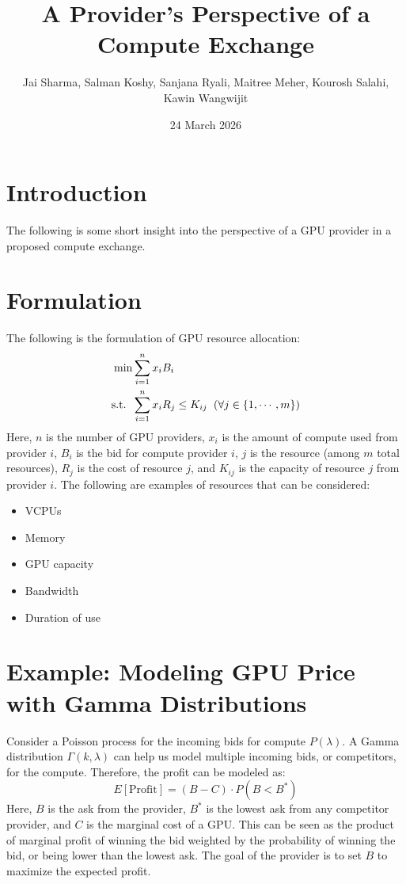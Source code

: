 \documentclass{article}
\title{A Provider's Perspective of a Compute Exchange}
\author{Jai Sharma, Salman Koshy, Sanjana Ryali, Maitree Meher, Kourosh Salahi, Kawin Wangwijit}
\date{24 March 2026}
\begin{document}
\maketitle
\tableofcontents
\newpage

\section{Introduction}
The following is some short insight into the perspective of a GPU provider in a proposed compute exchange. 

\section{Formulation}
The following is the formulation of GPU resource allocation:
\begin{align*}
    \min &\sum_{i = 1} ^n x_iB_i\\
    \text{s.t.}\hspace{2mm}&\sum_{i=1}^n x_iR_j \leq K_{ij} \hspace{2mm} (\forall j\in \{1,\cdots,m\})
\end{align*}
Here, $n$ is the number of GPU providers, $x_i$ is the amount of compute used from provider $i$, $B_i$ is the bid for compute provider $i$, $j$ is the resource (among $m$ total resources), $R_j$ is the cost of resource $j$, and $K_{ij}$ is the capacity of resource $j$ from provider $i$. The following are examples of resources that can be considered:
\begin{itemize}
    \item VCPUs
    \item Memory
    \item GPU capacity
    \item Bandwidth
    \item Duration of use
\end{itemize}

\section{Example: Modeling GPU Price with Gamma Distributions}
Consider a Poisson process for the incoming bids for compute $P(\lambda)$. A Gamma distribution $\Gamma (k, \lambda)$ can help us model multiple incoming bids, or competitors, for the compute. Therefore, the profit can be modeled as:
\[E[\text{Profit}] = (B - C)\cdot P(B<B^*)\]
Here, $B$ is the ask from the provider, $B^*$ is the lowest ask from any competitor provider, and $C$ is the marginal cost of a GPU. This can be seen as the product of marginal profit of winning the bid weighted by the probability of winning the bid, or being lower than the lowest ask. The goal of the provider is to set $B$ to maximize the expected profit. 
\end{document}
